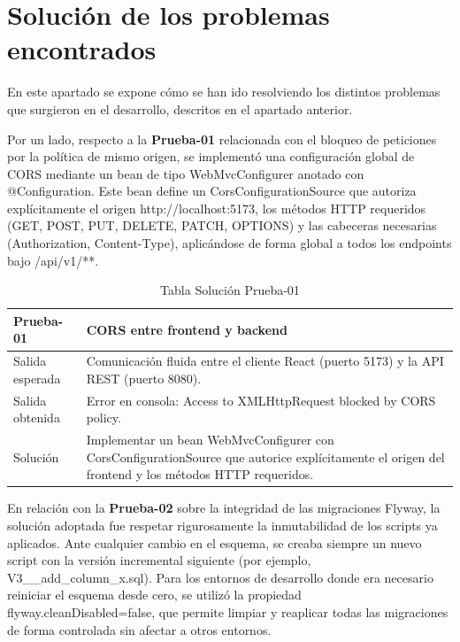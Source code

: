 \section{Solución de los problemas encontrados}
\label{sec:soluciones_problemas}

En este apartado se expone cómo se han ido resolviendo los distintos problemas que surgieron en el desarrollo, descritos en el apartado anterior.

Por un lado, respecto a la \textbf{Prueba-01} relacionada con el bloqueo de peticiones por la política de mismo origen, se implementó una configuración global de CORS mediante un bean de tipo WebMvcConfigurer anotado con @Configuration. Este bean define un CorsConfigurationSource que autoriza explícitamente el origen http://localhost:5173, los métodos HTTP requeridos (GET, POST, PUT, DELETE, PATCH, OPTIONS) y las cabeceras necesarias (Authorization, Content-Type), aplicándose de forma global a todos los endpoints bajo /api/v1/**.

\begin{table}[H]
\centering
\begin{tabular}{|p{}|p{}|}
\hline
\textbf{Prueba-01} & \textbf{CORS entre frontend y backend} \\ \hline
Salida esperada & Comunicación fluida entre el cliente React (puerto 5173) y la API REST (puerto 8080). \\ \hline
Salida obtenida & Error en consola: Access to XMLHttpRequest blocked by CORS policy. \\ \hline
Solución & Implementar un bean WebMvcConfigurer con CorsConfigurationSource que autorice explícitamente el origen del frontend y los métodos HTTP requeridos. \\ \hline
\end{tabular}
\caption{Tabla Solución Prueba-01}
\label{tab:sol_prueba01}
\end{table}

En relación con la \textbf{Prueba-02} sobre la integridad de las migraciones Flyway, la solución adoptada fue respetar rigurosamente la inmutabilidad de los scripts ya aplicados. Ante cualquier cambio en el esquema, se creaba siempre un nuevo script con la versión incremental siguiente (por ejemplo, V3__add_column_x.sql). Para los entornos de desarrollo donde era necesario reiniciar el esquema desde cero, se utilizó la propiedad flyway.cleanDisabled=false, que permite limpiar y reaplicar todas las migraciones de forma controlada sin afectar a otros entornos.

